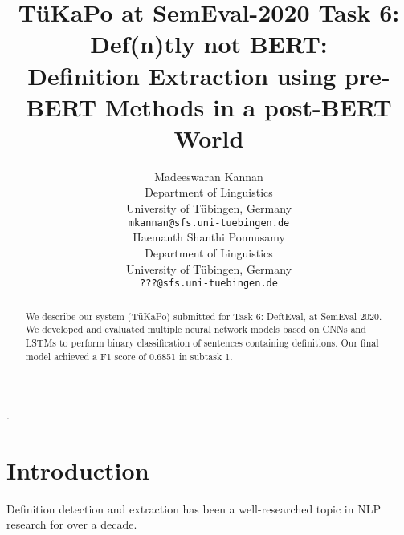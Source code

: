 \documentclass[11pt]{article}
\title{T\"uKaPo at SemEval-2020 Task 6: Def(n)tly not BERT:\\
Definition Extraction using pre-BERT Methods in a post-BERT World}
\author{Madeeswaran Kannan \\
  Department of Linguistics \\
  University of T\"ubingen, Germany \\
  {\tt mkannan@sfs.uni-tuebingen.de} \\\And
  Haemanth Shanthi Ponnusamy \\
  Department of Linguistics \\
  University of T\"ubingen, Germany \\
  {\tt ???@sfs.uni-tuebingen.de} \\}
\date{}
\begin{document}
\setlength{\parindent}{0pt}.

\maketitle
\begin{abstract}
  We describe our system (T\"{u}KaPo) submitted for Task 6: DeftEval, at SemEval 2020.
  We developed and evaluated multiple neural network models based on CNNs and LSTMs to
  perform binary classification of sentences containing definitions. Our final model
  achieved a F1 score of 0.6851 in subtask 1.
\end{abstract}


\section{Introduction}

Definition detection and extraction has been a well-researched topic in NLP research
for over a decade.
%
%
\end{document}
